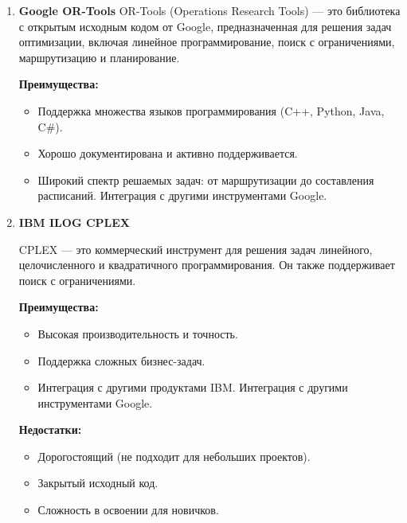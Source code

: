  \begin{enumerate}
    \item \noindent \textbf{Google OR-Tools}
OR-Tools (Operations Research Tools) — это библиотека с открытым исходным кодом от Google, предназначенная для решения задач оптимизации, включая линейное программирование, поиск с ограничениями, маршрутизацию и планирование.

\vspace{3mm}
\aim
\vspace{3mm} 

\noindent \textbf{Преимущества:}
\begin{itemize}
    \item Поддержка множества языков программирования (C++, Python, Java, C#).
    \item Хорошо документирована и активно поддерживается.
    \item Широкий спектр решаемых задач: от маршрутизации до составления расписаний.
Интеграция с другими инструментами Google.
\end{itemize} 

\vspace{3mm}
\aim
\vspace{3mm} 

\item \noindent \textbf{IBM ILOG CPLEX}

CPLEX — это коммерческий инструмент для решения задач линейного, целочисленного и квадратичного программирования. Он также поддерживает поиск с ограничениями.
\vspace{3mm}
\aim
\vspace{3mm} 

\noindent \textbf{Преимущества:}
\begin{itemize}
    \item Высокая производительность и точность.
    \item Поддержка сложных бизнес-задач.
    \item Интеграция с другими продуктами IBM.
Интеграция с другими инструментами Google.
\end{itemize}

\vspace{3mm}
\aim
\vspace{3mm}

\noindent \textbf{Недостатки:}
\begin{itemize}
\item Дорогостоящий (не подходит для небольших проектов).
\item Закрытый исходный код.
\item Сложность в освоении для новичков.
\end{itemize}


\end{enumerate}
